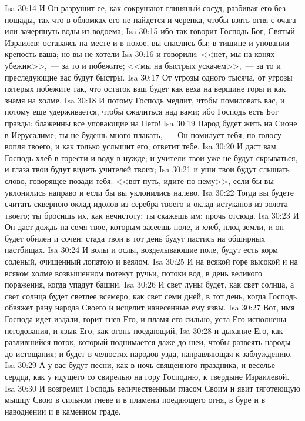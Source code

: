 \vs Isa 30:14 И Он разрушит ее, как сокрушают глиняный сосуд, разбивая его без пощады, так что в обломках его не найдется и черепка, чтобы взять огня с очага или зачерпнуть воды из водоема;
\vs Isa 30:15 ибо так говорит Господь Бог, Святый Израилев: оставаясь на месте и в покое, вы спаслись бы; в тишине и уповании крепость ваша; но вы не хотели
\vs Isa 30:16 и говорили: <<нет, мы на конях убежим>>,~--- за то и побежите; <<мы на быстрых ускачем>>,~--- за то и преследующие вас будут быстры.
\vs Isa 30:17 От угрозы одного  тысяча, от угрозы пятерых побежите так, что остаток ваш будет как веха на вершине горы и как знамя на холме.
\vs Isa 30:18 И потому Господь медлит, чтобы помиловать вас, и потому еще удерживается, чтобы сжалиться над вами; ибо Господь есть Бог правды: блаженны все уповающие на Него!
\vs Isa 30:19 Народ будет жить на Сионе в Иерусалиме; ты не будешь много плакать,~--- Он помилует тебя, по голосу вопля твоего, и как только услышит его, ответит тебе.
\vs Isa 30:20 И даст вам Господь хлеб в горести и воду в нужде; и учители твои уже не будут скрываться, и глаза твои будут видеть учителей твоих;
\vs Isa 30:21 и уши твои будут слышать слово, говорящее позади тебя: <<вот путь, идите по нему>>, если бы вы уклонились направо и если бы вы уклонились налево.
\vs Isa 30:22 Тогда вы будете считать скверною оклад идолов из серебра твоего и оклад истуканов из золота твоего; ты бросишь их, как нечистоту; ты скажешь им: прочь отсюда.
\vs Isa 30:23 И Он даст дождь на семя твое, которым засеешь поле, и хлеб, плод земли, и он будет обилен и сочен; стада твои в тот день будут пастись на обширных пастбищах.
\vs Isa 30:24 И волы и ослы, возделывающие поле, будут есть корм соленый, очищенный лопатою и веялом.
\vs Isa 30:25 И на всякой горе высокой и на всяком холме возвышенном потекут ручьи, потоки вод, в день великого поражения, когда упадут башни.
\vs Isa 30:26 И свет луны будет, как свет солнца, а свет солнца будет светлее всемеро, как свет семи дней, в тот день, когда Господь обвяжет рану народа Своего и исцелит нанесенные ему язвы.
\rsbpar\vs Isa 30:27 Вот, имя Господа идет издали, горит гнев Его, и пламя его сильно, уста Его исполнены негодования, и язык Его, как огонь поедающий,
\vs Isa 30:28 и дыхание Его, как разлившийся поток, который поднимается даже до шеи, чтобы развеять народы до истощания; и будет в челюстях народов узда, направляющая к заблуждению.
\vs Isa 30:29 А у вас будут песни, как в ночь священного праздника, и веселье сердца, как у идущего со свирелью на гору Господню, к твердыне Израилевой.
\vs Isa 30:30 И возгремит Господь величественным гласом Своим и явит тяготеющую мышцу Свою в сильном гневе и в пламени поедающего огня, в буре и в наводнении и в каменном граде.
